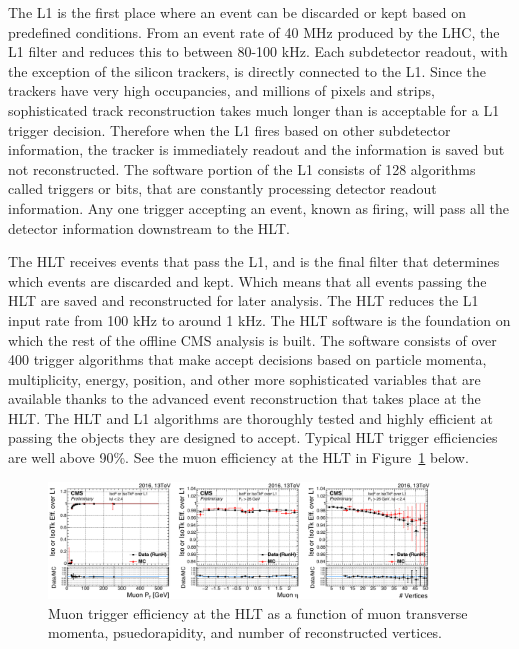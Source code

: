 The L1 is the first place where an event can be discarded or kept based on predefined conditions. From an event rate of 40 MHz produced by the LHC, the L1 filter and reduces this to between 80-100 kHz.  
Each subdetector readout, with the exception of the silicon trackers, is directly connected to the L1. Since the trackers have very high occupancies, and millions
of pixels and strips, sophisticated track reconstruction takes much longer than is acceptable for a L1 trigger decision. Therefore when the L1 fires based on other subdetector information, the tracker is immediately readout and the information is saved
but not reconstructed. The software portion of the L1 consists of 128 algorithms called triggers or bits, that are constantly processing detector readout information. Any one trigger accepting an event, known as firing, will pass all the detector information downstream
to the HLT. 

The HLT receives events that pass the L1, and is the final filter that determines which events are discarded and kept. Which means that all events passing the HLT are saved and reconstructed for later analysis.
The HLT reduces the L1 input rate from 100 kHz to around 1 kHz. The HLT software is the foundation on which the rest of the offline CMS analysis is built. The software consists of over 400 trigger algorithms that make accept decisions based on particle momenta,
multiplicity, energy, position, and other more sophisticated variables that are available thanks to the advanced event reconstruction that takes place at the HLT. The HLT and L1 algorithms are thoroughly tested and highly efficient at passing the objects they are
designed to accept. Typical HLT trigger efficiencies are well above 90$\%$. See the muon efficiency at the HLT in Figure~\ref{fig:hlt_eff_muons} below. 

\begin{figure}[hbtp]
 \begin{center}
   \includegraphics[width=0.9\textwidth]{ch3_figs/hlt_eff_muons.pdf}
   \caption{Muon trigger efficiency at the HLT as a function of muon transverse momenta, psuedorapidity, and number of reconstructed vertices.}
   \label{fig:hlt_eff_muons}
 \end{center}
\end{figure}

